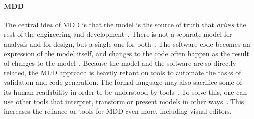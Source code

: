 \paragraph{\acrlong{MDD}}
The central idea of \acrlong{MDD} is that the model is the source of truth that \textit{drives} the rest of the engineering and development~\cite[p.~9]{brambillaModeldrivenSoftwareEngineering2012}.
There is not a separate model for analysis and for design, but a single one for both~\cite[p.~49]{evansDomaindrivenDesignTackling2004}.
The software code becomes an expression of the model itself, and changes to the code often happen as the result of changes to the model~\cite[p.~49]{evansDomaindrivenDesignTackling2004}.
Because the model and the software are so directly related, the \acrshort{MDD} approach is heavily reliant on tools to automate the tasks of validation and code generation.
The formal language may also sacrifice some of its human readability in order to be understood by tools~\cite[p.~232]{krogstieModelbasedDevelopmentEvolution2012}.
To solve this, one can use other tools that interpret, transform or present models in other ways~\cite[p.~233]{krogstieModelbasedDevelopmentEvolution2012}.
This increases the reliance on tools for \acrshort{MDD} even more, including visual editors.

